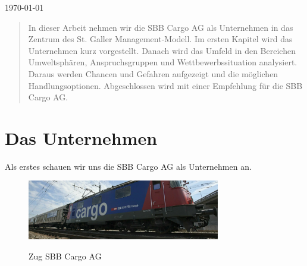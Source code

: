 \documentclass{article}
\begin{document}
\begin{titlepage}
    
    
    {\large \today}\\[2cm] %
    
    
     
    
    \vfill %
    
    \end{titlepage}

\setcounter{page}{2}

\begin{abstract}
In dieser Arbeit nehmen wir die SBB Cargo AG als Unternehmen in das Zentrum des St. Galler Management-Modell.
Im ersten Kapitel wird das Unternehmen kurz vorgestellt.
Danach wird das Umfeld in den Bereichen Umweltsphären, Anspruchsgruppen und Wettbewerbssituation analysiert.
Daraus werden Chancen und Gefahren aufgezeigt und die möglichen Handlungsoptionen.
Abgeschlossen wird mit einer Empfehlung für die SBB Cargo AG.
\end{abstract}

\tableofcontents

\newpage

\section{Das Unternehmen}

Als erstes schauen wir uns die SBB Cargo AG als Unternehmen an.

\begin{figure}[htbp] %
    \centering
    \includegraphics[width=0.75\textwidth]{sbbcargoag} %
    \caption{Zug SBB Cargo AG}\parencite[o. S.]{sbbcargoagBild}
    \label{fig:bildlabel2}
\end{figure}
\end{document}
